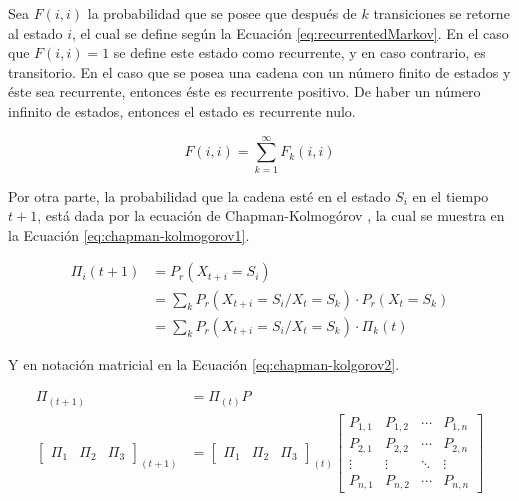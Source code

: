 \normalsize{Sea $F(i,i)$ la probabilidad que se posee que despu\'es de $k$ transiciones se retorne al estado $i$, el cual se define seg\'un la Ecuaci\'on} \ref{eq:recurrentedMarkov}. \normalsize{En el caso que $F(i,i)=1$ se define este estado como recurrente, y en caso contrario, es transitorio. En el caso que se posea una cadena con un n\'umero finito de estados y \'este sea recurrente, entonces \'este es recurrente positivo. De haber un n\'umero infinito de estados, entonces el estado es recurrente nulo.}

\begin{equation} \label{eq:recurrentedMarkov}
	F(i,i) = \sum_{k=1}^{\infty}{F_k(i,i)}
\end{equation}

Por otra parte, la probabilidad que la cadena est\'e en el estado $S_i$ en el tiempo $t+1$, est\'a dada por la ecuaci\'on de Chapman-Kolmog\'orov \citep{Papoulis1984}, la cual se muestra en la Ecuaci\'on \ref{eq:chapman-kolmogorov1}.

\begin{equation} \label{eq:chapman-kolmogorov1}
\begin{split}
	\Pi_{i} (t+1) &= P_r(X_{t+i}=S_i) \\
				  &= \sum _{k} P_r(X_{t+i} = S_i / X_t = S_k) \cdot P_r(X_t = S_k)\\
				  &= \sum _{k} P_r(X_{t+i} = S_i / X_t = S_k) \cdot \Pi_{k} (t)
\end{split}	
\end{equation}

Y en notaci\'on matricial en la Ecuaci\'on \ref{eq:chapman-kolgorov2}.

\begin{equation} \label{eq:chapman-kolgorov2}
\begin{split}
	\Pi_{(t+1)} &= \Pi_{(t)}P\\
	\begin{bmatrix}
		\Pi_1 & \Pi_2 & \Pi_3
	\end{bmatrix} _{(t+1)}
	&= \begin{bmatrix}
		\Pi_1 & \Pi_2 & \Pi_3
	\end{bmatrix} _{(t)}
	\begin{bmatrix}
		P_{1,1} & P_{1,2} & \cdots & P_{1,n} \\
		P_{2,1} & P_{2,2} & \cdots & P_{2,n} \\
		\vdots  & \vdots  & \ddots & \vdots  \\
		P_{n,1} & P_{n,2} & \cdots & P_{n,n}
	\end{bmatrix}
\end{split}
\end{equation}


